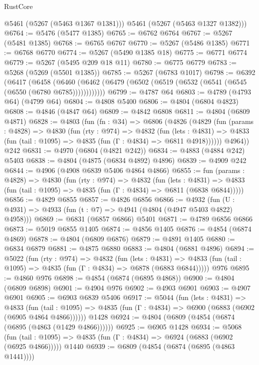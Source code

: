 \begin{lexlean}{RustCore}
\begin{coremodule}
        @5461
        (@5267 (@5463 @1367 @1381)))
      @5461
      (@5267 (@5463 @1327 @1382)))
@6764 := @5476 (@5477 @1385)
@6765 := @6762 @6764
@6767 := @5267 (@5481 @1385)
@6768 := @6765 @6767
@6770 := @5267 (@5486 @1385)
@6771 := @6768 @6770
@6774 := @5267 (@5490 @1385 @18)
@6775 := @6771 @6774
@6779 := @5267 (@5495 @209 @18 @11)
@6780 := @6775 @6779
@6783 := @5268 (@5269 (@5501 @1385))
@6785 := @5267 (@6783 @1017)
@6798 := @6392
    (@6417
      (@6458 (@6460 (@6462 (@6479 (@6502 (@6519 (@6532 (@6541 (@6545 (@6550 (@6780 @6785))))))))))))
@6799 := @4787 @64
@6803 := @4789 (@4793 @64) (@4799 @64)
@6804 := @4808 @5400
@6806 := @4804 (@6804 @4823)
@6808 := @4846 (@4847 @64)
@6809 := @4842 @6808
@6811 := @4804 (@6809 @4871)
@6828 := @4803
    (fun (fn : @34) =>
    @6806
      (@4826
        (@4829
          (fun (params : @4828) =>
          @4830
            (fun (rty : @974) =>
            @4832
              (fun (lets : @4831) =>
              @4833 (fun (tail : @1095) => @4835 (fun (Γ : @4834) => @6811 @4918))))))
        @4964))
    @242
@6831 := @4970 (@6804 (@4821 @242))
@6834 := @4883 (@4884 @242) @5403
@6838 := @4804 (@4875 (@6834 @4892) @4896)
@6839 := @4909 @242
@6844 := @4906 (@4908 @6839 @5406 @4864 @4866)
@6855 := fun (params : @4828) =>
  @4830
    (fun (rty : @974) =>
    @4832
      (fun (lets : @4831) =>
      @4833 (fun (tail : @1095) => @4835 (fun (Γ : @4834) => @6811 (@6838 @6844)))))
@6856 := @4829 @6855
@6857 := @4826 @6856
@6866 := @4932 (fun (U : @4931) => @4933 (fun (t : @7) => @4941 (@4804 (@4947 @5403 @4822) @4958)))
@6869 := @6831 (@6857 @6866) @5401
@6871 := @4789 @6856 @6866
@6873 := @5019 @6855 @1405
@6874 := @4856 @1405
@6876 := @4854 (@6874 @4869)
@6878 := @4804 (@6809 @6876)
@6879 := @4891 @1405
@6880 := @6834 @6879
@6881 := @4875 @6880
@6883 := @4804 (@6881 @4896)
@6894 := @5022
    (fun (rty : @974) =>
    @4832
      (fun (lets : @4831) =>
      @4833 (fun (tail : @1095) => @4835 (fun (Γ : @4834) => @6878 (@6883 @6844)))))
    @976
@6895 := @4860 @976
@6898 := @4854 (@6874 (@6895 @4868))
@6900 := @4804 (@6809 @6898)
@6901 := @4904 @976
@6902 := @4903 @6901
@6903 := @4907 @6901
@6905 := @6903 @6839 @5406
@6917 := @5044
    (fun (lets : @4831) =>
    @4833
      (fun (tail : @1095) => @4835 (fun (Γ : @4834) => @6900 (@6883 (@6902 (@6905 @4864 @4866))))))
    @1428
@6924 := @4804 (@6809 (@4854 (@6874 (@6895 (@4863 (@1429 @4866))))))
@6925 := @6905 @1428
@6934 := @5068
    (fun (tail : @1095) => @4835 (fun (Γ : @4834) => @6924 (@6883 (@6902 (@6925 @4866)))))
    @1440
@6939 := @6809 (@4854 (@6874 (@6895 (@4863 @1441))))

\end{coremodule}
\end{lexlean}
